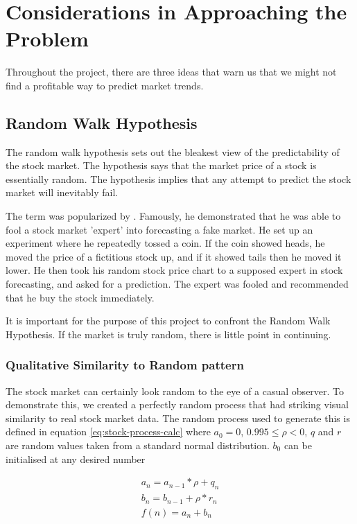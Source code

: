 \documentclass{report}
\begin{document}
\chapter{Considerations in Approaching the Problem}

Throughout the project, there are three ideas that warn us that we might not find a profitable way to predict market trends.

\section{Random Walk Hypothesis}

The random walk hypothesis sets out the bleakest view of the predictability of the stock market. The hypothesis says that the market price of a stock is essentially random. The hypothesis implies that any attempt to predict the stock market will inevitably fail. 

The term was popularized by \citet{malkiel1999random}. Famously, he demonstrated that he was able to fool a stock market 'expert' into forecasting a fake market. He set up an experiment where he repeatedly tossed a coin. If the coin showed heads, he moved the price of a fictitious stock up, and if it showed tails then he moved it lower. He then took his random stock price chart to a supposed expert in stock forecasting, and asked for a prediction. The expert was fooled and recommended that he buy the stock immediately. 

It is important for the purpose of this project to confront the Random Walk Hypothesis. If the market is truly random, there is little point in continuing. 

\subsection{Qualitative Similarity to Random pattern}

The stock market can certainly look random to the eye of a casual observer. To demonstrate this, we created a perfectly random process that had striking visual similarity to real stock market data. The random process used to generate this is defined in equation \ref{eq:stock-process-calc} where $a_{0} = 0$, $0.995 \leq \rho < 0$, $q$ and $r$ are random values taken from a standard normal distribution. $b_{0}$ can be initialised at any desired number

\begin{equation}
  \label{eq:stock-process-calc}
  \begin{aligned}
  	a_{n} = a_{n-1} * \rho + q_{n}\\
  	b_{n} = b_{n-1} + \rho * r_{n}\\
  	f(n) = a_{n} + b_{n}\\   
  \end{aligned}
\end{equation}
\end{document}
